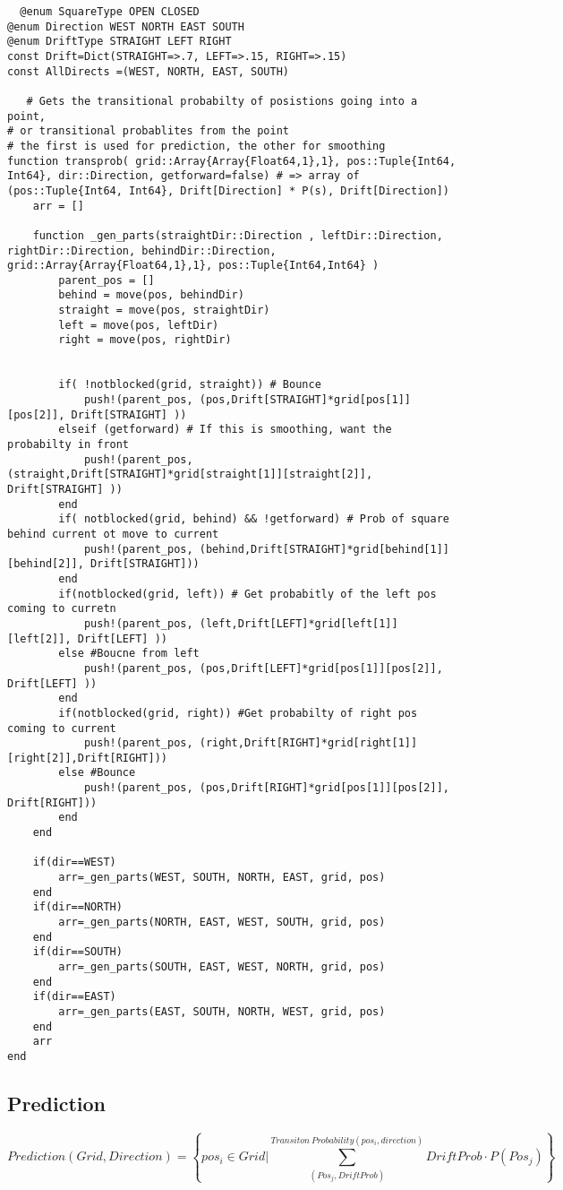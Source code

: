 \documentclass[11pt]{article}
\begin{document}
\begin{verbatim}
  @enum SquareType OPEN CLOSED
@enum Direction WEST NORTH EAST SOUTH
@enum DriftType STRAIGHT LEFT RIGHT
const Drift=Dict(STRAIGHT=>.7, LEFT=>.15, RIGHT=>.15)
const AllDirects =(WEST, NORTH, EAST, SOUTH)

   # Gets the transitional probabilty of posistions going into a point,
# or transitional probablites from the point
# the first is used for prediction, the other for smoothing
function transprob( grid::Array{Array{Float64,1},1}, pos::Tuple{Int64, Int64}, dir::Direction, getforward=false) # => array of  (pos::Tuple{Int64, Int64}, Drift[Direction] * P(s), Drift[Direction])
	arr = []

	function _gen_parts(straightDir::Direction , leftDir::Direction, rightDir::Direction, behindDir::Direction, grid::Array{Array{Float64,1},1}, pos::Tuple{Int64,Int64} )
		parent_pos = []
		behind = move(pos, behindDir)
		straight = move(pos, straightDir)
		left = move(pos, leftDir)
		right = move(pos, rightDir)


		if( !notblocked(grid, straight)) # Bounce
			push!(parent_pos, (pos,Drift[STRAIGHT]*grid[pos[1]][pos[2]], Drift[STRAIGHT] ))
		elseif (getforward) # If this is smoothing, want the probabilty in front
			push!(parent_pos, (straight,Drift[STRAIGHT]*grid[straight[1]][straight[2]], Drift[STRAIGHT] ))
		end
		if( notblocked(grid, behind) && !getforward) # Prob of square behind current ot move to current
			push!(parent_pos, (behind,Drift[STRAIGHT]*grid[behind[1]][behind[2]], Drift[STRAIGHT]))
		end
		if(notblocked(grid, left)) # Get probabitly of the left pos coming to curretn
			push!(parent_pos, (left,Drift[LEFT]*grid[left[1]][left[2]], Drift[LEFT] ))
		else #Boucne from left
			push!(parent_pos, (pos,Drift[LEFT]*grid[pos[1]][pos[2]], Drift[LEFT] ))
		end
		if(notblocked(grid, right)) #Get probabilty of right pos coming to current
			push!(parent_pos, (right,Drift[RIGHT]*grid[right[1]][right[2]],Drift[RIGHT]))
		else #Bounce
			push!(parent_pos, (pos,Drift[RIGHT]*grid[pos[1]][pos[2]], Drift[RIGHT]))
		end
	end

	if(dir==WEST)
		arr=_gen_parts(WEST, SOUTH, NORTH, EAST, grid, pos)
	end
	if(dir==NORTH)
		arr=_gen_parts(NORTH, EAST, WEST, SOUTH, grid, pos)
	end
	if(dir==SOUTH)
		arr=_gen_parts(SOUTH, EAST, WEST, NORTH, grid, pos)
	end
	if(dir==EAST)
		arr=_gen_parts(EAST, SOUTH, NORTH, WEST, grid, pos)
	end
	arr
end

\end{verbatim}

\subsection{Prediction}
\label{sec:org07a2d75}
$$Prediction(Grid, Direction) = \left\{pos_i \in Grid | \sum^{Transiton\ Probability(pos_i, direction)}_{(Pos_j, DriftProb)} DriftProb \cdot P(Pos_j) \right \}$$
\end{document}
